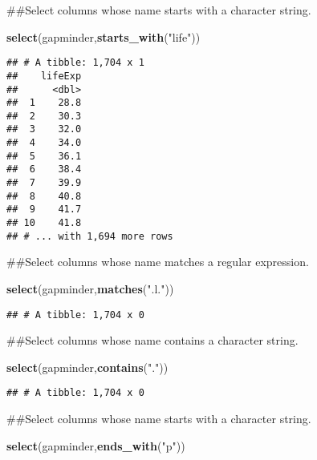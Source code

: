 \documentclass[]{article}
\newenvironment{Shaded}{\begin{snugshade}}{\end{snugshade}}
\newcommand{\KeywordTok}[1]{\textcolor[rgb]{0.13,0.29,0.53}{\textbf{#1}}}
\newcommand{\NormalTok}[1]{#1}
\newcommand{\StringTok}[1]{\textcolor[rgb]{0.31,0.60,0.02}{#1}}
\begin{document}
\begin{Shaded}
\begin{Highlighting}[]
\NormalTok{##Select columns whose name starts with a character string. }

\KeywordTok{select}\NormalTok{(gapminder,}\KeywordTok{starts_with}\NormalTok{(}\StringTok{"life"}\NormalTok{))}
\end{Highlighting}
\end{Shaded}

\begin{verbatim}
## # A tibble: 1,704 x 1
##    lifeExp
##      <dbl>
##  1    28.8
##  2    30.3
##  3    32.0
##  4    34.0
##  5    36.1
##  6    38.4
##  7    39.9
##  8    40.8
##  9    41.7
## 10    41.8
## # ... with 1,694 more rows
\end{verbatim}

\begin{Shaded}
\begin{Highlighting}[]
\NormalTok{##Select columns whose name matches a regular expression. }

\KeywordTok{select}\NormalTok{(gapminder,}\KeywordTok{matches}\NormalTok{(}\StringTok{".l."}\NormalTok{))}
\end{Highlighting}
\end{Shaded}

\begin{verbatim}
## # A tibble: 1,704 x 0
\end{verbatim}

\begin{Shaded}
\begin{Highlighting}[]
\NormalTok{##Select columns whose name contains a character string. }

\KeywordTok{select}\NormalTok{(gapminder,}\KeywordTok{contains}\NormalTok{(}\StringTok{"."}\NormalTok{))}
\end{Highlighting}
\end{Shaded}

\begin{verbatim}
## # A tibble: 1,704 x 0
\end{verbatim}

\begin{Shaded}
\begin{Highlighting}[]
\NormalTok{##Select columns whose name starts with a character string. }

\KeywordTok{select}\NormalTok{(gapminder,}\KeywordTok{ends_with}\NormalTok{(}\StringTok{"p"}\NormalTok{))}
\end{Highlighting}
\end{Shaded}
\end{document}
